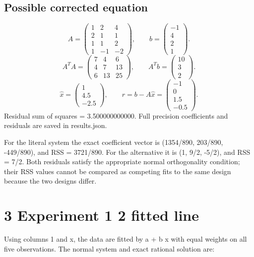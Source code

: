 \documentclass[a4paper,11pt]{article}
\begin{document}
\subsection*{Possible corrected equation}
\[A=\begin{pmatrix}1&2&4\\2&1&1\\1&1&2\\1&-1&-2\end{pmatrix},\qquad b=\begin{pmatrix}-1\\4\\2\\1\end{pmatrix}.\]
\[A^TA=\begin{pmatrix}7&4&6\\4&7&13\\6&13&25\end{pmatrix},\qquad A^Tb=\begin{pmatrix}10\\3\\2\end{pmatrix}.\]
\[\widehat{x}=\begin{pmatrix}1\\4.5\\-2.5\end{pmatrix},\qquad r=b-A\widehat{x}=\begin{pmatrix}-1\\0\\1.5\\-0.5\end{pmatrix}.\]
Residual sum of squares = 3.500000000000. Full precision coefficients and residuals are saved in results.json.

For the literal system the exact coefficient vector is (1354/890, 203/890, -449/890), and RSS = 3721/890. For the alternative it is (1, 9/2, -5/2), and RSS = 7/2. Both residuals satisfy the appropriate normal orthogonality condition; their RSS values cannot be compared as competing fits to the same design because the two designs differ.

\clearpage
\section*{3 Experiment 1 2 fitted line}
Using columns 1 and x, the data are fitted by a + b x with equal weights on all five observations. The normal system and exact rational solution are:
\end{document}
